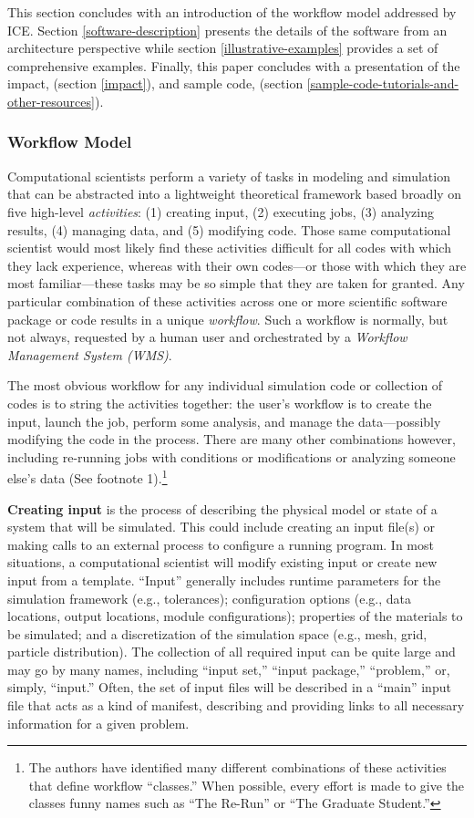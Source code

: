 This section concludes with an introduction of the workflow model addressed by
ICE. Section \ref{software-description} presents the details of the software
from an architecture perspective while section \ref{illustrative-examples}
provides a set of comprehensive examples. Finally, this paper concludes with a
presentation of the impact, (section \ref{impact}), and sample code,
(section \ref{sample-code-tutorials-and-other-resources}).

\subsubsection{Workflow Model}\label{workflow-model}

Computational scientists perform a variety of tasks in modeling and
simulation that can be abstracted into a lightweight theoretical
framework based broadly on five high-level \emph{activities}: (1)
creating input, (2) executing jobs, (3) analyzing results, (4) managing
data, and (5) modifying code. Those same computational scientist would
most likely find these activities difficult for all codes with which
they lack experience, whereas with their own codes---or those with which
they are most familiar---these tasks may be so simple that they are
taken for granted. Any particular combination of these activities across
one or more scientific software package or code results in a unique
\emph{workflow}. Such a workflow is normally, but not always, requested
by a human user and orchestrated by a \emph{Workflow Management System
(WMS)}.

The most obvious workflow for any individual simulation code or
collection of codes is to string the activities together: the user's
workflow is to create the input, launch the job, perform some analysis,
and manage the data---possibly modifying the code in the process. There
are many other combinations however, including re-running jobs with
conditions or modifications or analyzing someone else's data (See
footnote 1).\footnote{The
authors have identified many different combinations of these activities that
define workflow ``classes.'' When possible, every effort is made to give the
classes funny names such as ``The Re-Run'' or ``The Graduate Student.''}

\textbf{Creating input} is the process of describing the physical model
or state of a system that will be simulated. This could include creating
an input file(s) or making calls to an external process to configure a
running program. In most situations, a computational scientist will
modify existing input or create new input from a template. ``Input''
generally includes runtime parameters for the simulation framework
(e.g., tolerances); configuration options (e.g., data locations, output
locations, module configurations); properties of the materials to be
simulated; and a discretization of the simulation space (e.g., mesh,
grid, particle distribution). The collection of all required input can
be quite large and may go by many names, including ``input set,''
``input package,'' ``problem,'' or, simply, ``input.'' Often, the set of
input files will be described in a ``main'' input file that acts as a
kind of manifest, describing and providing links to all necessary
information for a given problem.

